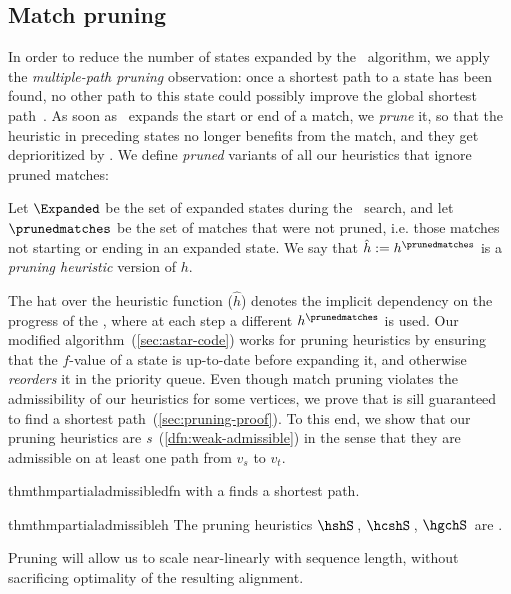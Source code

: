 \subsection{Match pruning} \label{sec:pruning}

In order to reduce the number of states expanded by the \A~algorithm, we apply
the \emph{multiple-path pruning} observation: once a shortest path to a state
has been found, no other path to this state could possibly improve the global
shortest path~\citep{poole2017artificial}. As soon as \A~expands the start or
end of a match, we \emph{prune} it, so that the heuristic in preceding states no
longer benefits from the match, and they get deprioritized by \A. We define
\emph{pruned} variants of all our heuristics that ignore pruned matches:

\begin{definition}
   Let $\Expanded$ be the set of expanded states during the \A~search, and let
   $\prunedmatches$ be the set of matches that were not pruned, i.e. those
   matches not starting or ending in an expanded state. We say that $\hat h :=
   h^\prunedmatches$ is a \emph{pruning heuristic} version of $h$.
\end{definition}

The hat over the heuristic function ($\hat h$) denotes the implicit dependency
on the progress of the \A, where at each step a different $h^\prunedmatches$ is
used. Our modified \A algorithm~(\cref{sec:astar-code})
works for pruning heuristics by ensuring that the $f$-value of a state is
up-to-date before expanding it, and otherwise \emph{reorders} it in the priority
queue. Even though match pruning violates the admissibility of our heuristics
for some vertices, we prove that \A is sill guaranteed to find a shortest
path~(\cref{sec:pruning-proof}). To this end, we show that our pruning
heuristics are \emph{\wah{}s}~(\cref{dfn:weak-admissible}) in the sense that
they are admissible on at least one path from $v_s$ to $v_t$.

\begin{restatable}{thm}{thmpartialadmissibledfn}\label{thm:weak-admissible-dfn}
  \A with a \wah finds a shortest path.
\end{restatable}

\begin{restatable}{thm}{thmpartialadmissibleh}\label{thm:weak-admissible-h}
  The pruning heuristics $\hshS$\,, $\hcshS$\,, $\hgchS$\, are \wa.
\end{restatable}

Pruning will allow us to scale
near-linearly with sequence length, without sacrificing optimality of the
resulting alignment.
